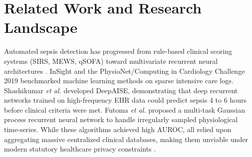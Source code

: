 \documentclass[final,5p,times,twocolumn]{elsarticle}
\begin{document}
\section{Related Work and Research Landscape}
Automated sepsis detection has progressed from rule-based clinical scoring systems (SIRS, MEWS, qSOFA) toward multivariate recurrent neural architectures \cite{singer2016sepsis3,desautels2016prediction}. InSight \cite{desautels2016prediction} and the PhysioNet/Computing in Cardiology Challenge 2019 \cite{reyna2020physionet} benchmarked machine learning methods on sparse intensive care logs. Shashikumar \textit{et al.} \cite{shashikumar2021deepai} developed DeepAISE, demonstrating that deep recurrent networks trained on high-frequency EHR data could predict sepsis 4 to 6 hours before clinical criteria were met. Futoma \textit{et al.} \cite{futoma2017learning} proposed a multi-task Gaussian process recurrent neural network to handle irregularly sampled physiological time-series. While these algorithms achieved high AUROC, all relied upon aggregating massive centralized clinical databases, making them unviable under modern statutory healthcare privacy constraints \cite{kaissis2020trustworthy}.

\begin{table}[!t]
\centering
\caption{Comparative Taxonomy of Related Frameworks vs. Proposed FPDAF-v2}\label{tab:gap_analysis}
\scriptsize
\renewcommand{\arraystretch}{1.2}
\end{table}
\end{document}
